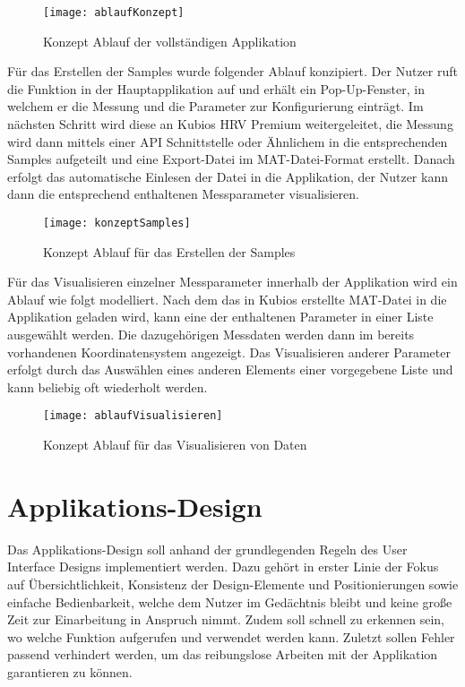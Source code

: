 \begin{figure}[H]
	\centering
	\texttt{[image: ablaufKonzept]}
	\caption{Konzept Ablauf der vollständigen Applikation}
	\label{fig:ablaufKonzept}
\end{figure}

Für das Erstellen der Samples wurde folgender Ablauf konzipiert. Der Nutzer ruft die Funktion in der Hauptapplikation auf und erhält ein Pop-Up-Fenster, in welchem er die Messung und die Parameter zur Konfigurierung einträgt. Im nächsten Schritt wird diese an Kubios HRV Premium weitergeleitet, die Messung wird dann mittels einer \acs{API} Schnittstelle oder Ähnlichem in die entsprechenden Samples aufgeteilt und eine Export-Datei im MAT-Datei-Format erstellt. Danach erfolgt das automatische Einlesen der Datei in die Applikation, der Nutzer kann dann die entsprechend enthaltenen Messparameter visualisieren.

\begin{figure}[H]
	\centering
	\texttt{[image: konzeptSamples]}
	\caption{Konzept Ablauf für das Erstellen der Samples}
	\label{fig:konzeptSamples}
\end{figure}

Für das Visualisieren einzelner Messparameter innerhalb der Applikation wird ein Ablauf wie folgt modelliert. Nach dem das in Kubios erstellte MAT-Datei in die Applikation geladen wird, kann eine der enthaltenen Parameter in einer Liste ausgewählt werden. Die dazugehörigen Messdaten werden dann im bereits vorhandenen Koordinatensystem angezeigt. Das Visualisieren anderer Parameter erfolgt durch das Auswählen eines anderen Elements einer vorgegebene Liste und kann beliebig oft wiederholt werden. 

\begin{figure}[H]
	\centering
	\texttt{[image: ablaufVisualisieren]}
	\caption{Konzept Ablauf für das Visualisieren von Daten}
	\label{fig:ablaufVisualisieren}
\end{figure}

\section{Applikations-Design}

Das Applikations-Design soll anhand der grundlegenden Regeln des User Interface Designs implementiert werden. Dazu gehört in erster Linie der Fokus auf Übersichtlichkeit, Konsistenz der Design-Elemente und Positionierungen sowie einfache Bedienbarkeit, welche dem Nutzer im Gedächtnis bleibt und keine große Zeit zur Einarbeitung in Anspruch nimmt. Zudem soll schnell zu erkennen sein, wo welche Funktion aufgerufen und verwendet werden kann. Zuletzt sollen Fehler passend verhindert werden, um das reibungslose Arbeiten mit der Applikation garantieren zu können.

